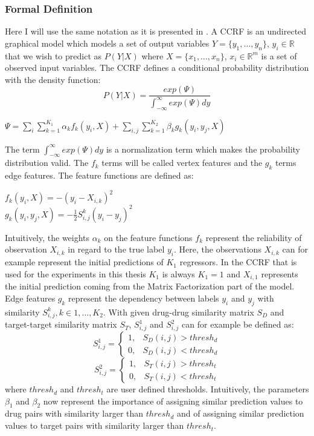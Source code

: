 \subsubsection{Formal Definition}
Here I will use the same notation as it is presented in \cite{baltruvsaitis2013dimensional}. A CCRF is an undirected graphical model which models a set of output variables $Y=\{y_1,\dots,y_n\}$, $y_i \in \mathbb{R}$ that we wish to predict as $P(Y|X)$ where  $X=\{x_1,\dots,x_n\}$, $x_i \in \mathbb{R}^m$ is a set of observed input variables. The CCRF defines a conditional probability distribution with the density function:
\begin{equation}\label{eq:CCRF_main}
P(Y|X)=\frac{exp(\Psi)}{\int_{-\infty}^{\infty} exp(\Psi) dy}
\end{equation}
\begin{center}
$\Psi=\sum_i \sum\limits_{k=1}^{K_1} \alpha_k f_k(y_i, X) + \sum_{i,j} \sum \limits_{k=1}^{K_2} \beta_k g_k (y_i, y_j,X)$
\end{center}
The term $\int_{-\infty}^{\infty} exp(\Psi) dy$ is a normalization term which makes the probability distribution valid. The $f_k$ terms will be called vertex features and the $g_k$ terms edge features. The feature functions are defined as:
\begin{center}
$f_k(y_i,X) = -(y_i - X_{i,k})^2$\\
$g_k(y_i,y_j,X) = -\frac{1}{2}S_{i,j}^k(y_i - y_j)^2$
\end{center}
Intuitively, the weights $\alpha_k$ on the feature functions $f_k$ represent the reliability of observation $X_{i,k}$ in regard to the true label $y_i$. Here, the observations $X_{i,k}$ can for example represent the initial predictions of $K_1$ regressors. In the CCRF that is used for the experiments in this thesis $K_1$ is always $K_1=1$ and $X_{i,1}$ represents the initial prediction coming from the Matrix Factorization part of the model.  Edge features $g_k$ represent the dependency between labels $y_i$ and $y_j$ with similarity $S_{i,j}^k, k \in 1,\dots, K_2$. With given drug-drug similarity matrix $S_D$ and target-target similarity matrix $S_T$, $S_{i,j}^1$ and $S_{i,j}^2$ can for example be defined as:
\begin{equation}
\label{simi_1}
S_{i,j}^1 =
\begin{cases}
1, & S_D(i,j) > thresh_d \\
0, & S_D(i,j) < thresh_d
\end{cases} 
\end{equation}
\begin{equation}
\label{simi_2}
S_{i,j}^2 =
\begin{cases}
1, & S_T(i,j) > thresh_t \\
0, & S_T(i,j) < thresh_t
\end{cases} 
\end{equation}
where $thresh_d$ and $thresh_t$ are user defined thresholds. Intuitively, the parameters $\beta_1$ and $\beta_2$ now represent the importance of assigning similar prediction values to drug pairs with similarity larger than $thresh_d$ and of assigning similar prediction values to target pairs with similarity larger than $thresh_t$.


